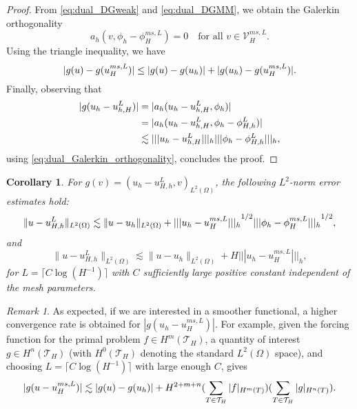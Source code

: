 \documentclass[10pt]{article}
\numberwithin{equation}{section}
\theoremstyle{plain}
\newtheorem{corollary}[theorem]{Corollary}
\theoremstyle{definition}
\theoremstyle{remark}
\newtheorem{rem}[theorem]{Remark}
\begin{document}
\begin{proof}
From \eqref{eq:dual_DGweak} and \eqref{eq:dual_DGMM}, we obtain the Galerkin orthogonality
\begin{equation}\label{eq:dual_Galerkin_orthogonality}
  a_h(v,\phi_h-\phi_{H}^{ms,L}) = 0\quad\text{for all }v\in{\mathcal{V}}_H^{ms,L}.
\end{equation}
Using the triangle inequality, we have
\begin{equation}\notag
  |g(u)-g(u_H^{ms,L})|\leq|g(u)-g(u_h)|+|g(u_h)-g(u_H^{ms,L})|.
\end{equation}
Finally, observing that
\begin{equation}\notag
  \begin{aligned}
    |g(u_h - u_{h,H}^L)|&= |a_h(u_h - u_{h,H}^L,\phi_h)| \\
    & = |a_h(u_h - u_{h,H}^L,\phi_h - \phi_{H,h}^L)| \\
    & \lesssim {||| {u_h - u_{h,H}^L} |||_h}{||| {\phi_h - \phi_{H,h}^L} |||_h}, \\
  \end{aligned}
\end{equation}
using \eqref{eq:dual_Galerkin_orthogonality}, concludes the proof.
\end{proof}
\begin{corollary}\label{cor:L2bound}
 For $g(v)=(u_h-u_{H,h}^L,v)_{L^2(\Omega)}$, the following $L^2$-norm error estimates hold:
 \begin{equation}\notag
  \|u-u_{H,h}^L\|_{L^2(\Omega)} \lesssim \|u-u_h\|_{L^2(\Omega)}+{||| {u_h - u_H^{ms,L}} |||_h}^{1/2}{||| {\phi_h - \phi_H^{ms,L}} |||_h}^{1/2},
\end{equation}
and
 \begin{equation}\label{eq:L2est_2}
  \|u-u_{H,h}^L\|_{L^2(\Omega)} \lesssim \|u-u_h\|_{L^2(\Omega)}+H{||| {u_h - u_H^{ms,L}} |||_h},
\end{equation}
for $L=\lceil C\log(H^{-1})\rceil$ with $C$ sufficiently large positive constant independent of the mesh parameters.
\end{corollary}
\begin{rem}
As expected, if we are interested in a smoother functional, a higher convergence rate is obtained for $|g(u_h-u_H^{ms,L})|$. For example, given the forcing function for the primal problem $f\in H^m({\mathcal{T}}_H)$, a quantity of interest $g\in H^n({\mathcal{T}}_H)$ (with $H^0({\mathcal{T}}_H)$ denoting the standard $L^2(\Omega)$ space), and choosing $L=\lceil C\log(H^{-1}) \rceil$ with large enough $C$, gives
\begin{equation}\notag
  \begin{aligned}
    |g(u - u_{H}^{ms,L})| \lesssim |g(u)-g(u_h)| +  H^{2+m+n}(\sum_{T\in{\mathcal{T}}_H}|f|_{H^m(T)})(\sum_{T\in{\mathcal{T}}_H}|g|_{H^n(T)}).
  \end{aligned}
\end{equation}
\end{rem}
\end{document}
